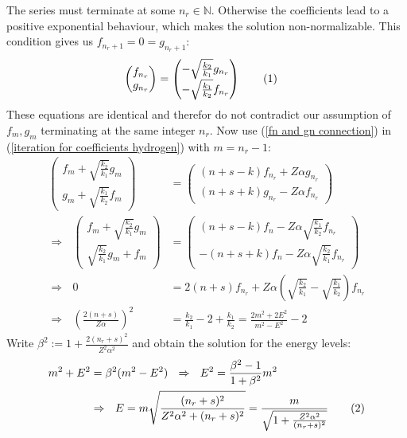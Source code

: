 \documentclass[a4paper,12pt]{article}
\newcommand\numberthis{\addtocounter{equation}{1}\tag{\theequation}}
\newcommand{\kla}{}
\begin{document}
The series must terminate at some $n_r\in\mathbb{N}$. Otherwise the coefficients lead to a positive exponential behaviour, which makes the solution non-normalizable. This condition gives us $f_{n_r+1}=0=g_{n_r+1}$:
\begin{align*}
\begin{pmatrix}
f_{n_r} \\ g_{n_r}
\end{pmatrix}&=\begin{pmatrix}
-\sqrt{\frac{k_2}{k_1}}g_{n_r} \\ -\sqrt{\frac{k_1}{k_2}}f_{n_r}
\end{pmatrix}\numberthis\label{fn and gn connection}
\end{align*}
These equations are identical and therefor do not contradict our assumption of $f_m,g_m$ terminating at the same integer $n_r$. Now use (\ref{fn and gn connection}) in (\ref{iteration for coefficients hydrogen}) with $m=n_r-1$:
\begin{align*}
\begin{pmatrix}
f_m+\sqrt{\frac{k_2}{k_1}}g_m \\ g_m+\sqrt{\frac{k_1}{k_2}}f_m
\end{pmatrix}&=\begin{pmatrix}
(n+s-k)f_{n_r}+Z\alpha g_{n_r} \\ (n+s+k)g_{n_r}-Z\alpha f_{n_r}
\end{pmatrix}\\
\Rightarrow\ \ \ \begin{pmatrix}
f_m+\sqrt{\frac{k_2}{k_1}}g_m \\ \sqrt{\frac{k_2}{k_1}}g_m+ f_m
\end{pmatrix}&=\begin{pmatrix}
(n+s-k)f_n-Z\alpha\sqrt{\frac{k_1}{k_2}}f_{n_r} \\ -(n+s+k)f_n-Z\alpha\sqrt{\frac{k_2}{k_1}}f_{n_r}
\end{pmatrix}\\
\Rightarrow\ \ \ 0&=2(n+s)f_{n_r}+Z\alpha\kla\left( {\sqrt{\frac{k_2}{k_1}}-\sqrt{\frac{k_1}{k_2}}} \right)f_{n_r}\\
\Rightarrow\ \ \ \kla\left( {\frac{2(n+s)}{Z\alpha}} \right)^2 &=\frac{k_2}{k_1}-2+\frac{k_1}{k_2}=\frac{2m^2+2E^2}{m^2-E^2}-2
\end{align*}
Write $\beta^2:=1+\frac{2(n_r+s)^2}{Z^2\alpha^2}$ and obtain the solution for the energy levels:
\begin{align*}
m^2+E^2&=\beta^2(m^2-E^2)\ \ \Rightarrow\ \ E^2=\frac{\beta^2-1}{1+\beta^2}m^2\\
&\Rightarrow\ \ E=m\sqrt{\frac{(n_r+s)^2}{Z^2\alpha^2+(n_r+s)^2}}=\frac{m}{\sqrt{1+\frac{Z^2\alpha^2}{(n_r+s)^2}}}\numberthis\label{hydrogen energy natural units}
\end{align*}
\end{document}
